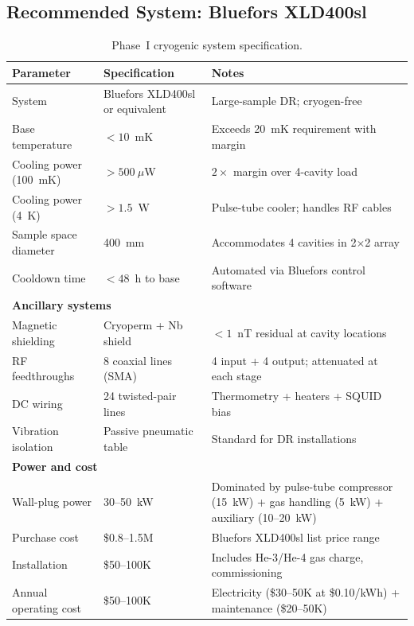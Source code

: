 \documentclass[11pt]{article}
\theoremstyle{definition}
\theoremstyle{remark}
\begin{document}
\subsection{Recommended System: Bluefors XLD400sl}

\begin{table}[H]
\centering
\caption{Phase~I cryogenic system specification.}
\label{tab:cryo_spec}
\renewcommand{\arraystretch}{1.3}
\begin{tabular}{p{4cm}p{3cm}p{5.5cm}}
\toprule
\textbf{Parameter} & \textbf{Specification} & \textbf{Notes} \\
\midrule
System & Bluefors XLD400sl or equivalent &
  Large-sample DR; cryogen-free \\
Base temperature & $< 10$~mK &
  Exceeds 20~mK requirement with margin \\
Cooling power (100~mK) & $> 500~\mu$W &
  $2\times$ margin over 4-cavity load \\
Cooling power (4~K) & $> 1.5$~W &
  Pulse-tube cooler; handles RF cables \\
Sample space diameter & 400~mm &
  Accommodates 4 cavities in 2$\times$2 array \\
Cooldown time & $< 48$~h to base &
  Automated via Bluefors control software \\
\midrule
\multicolumn{3}{l}{\textbf{Ancillary systems}} \\
\midrule
Magnetic shielding & Cryoperm + Nb shield &
  $< 1$~nT residual at cavity locations \\
RF feedthroughs & 8 coaxial lines (SMA) &
  4 input + 4 output; attenuated at each stage \\
DC wiring & 24 twisted-pair lines &
  Thermometry + heaters + SQUID bias \\
Vibration isolation & Passive pneumatic table &
  Standard for DR installations \\
\midrule
\multicolumn{3}{l}{\textbf{Power and cost}} \\
\midrule
Wall-plug power & 30--50~kW &
  Dominated by pulse-tube compressor (15~kW)
  + gas handling (5~kW) + auxiliary (10--20~kW) \\
Purchase cost & \$0.8--1.5M &
  Bluefors XLD400sl list price range \\
Installation & \$50--100K &
  Includes He-3/He-4 gas charge, commissioning \\
Annual operating cost & \$50--100K &
  Electricity (\$30--50K at \$0.10/kWh) +
  maintenance (\$20--50K) \\
\bottomrule
\end{tabular}
\end{table}
\end{document}
